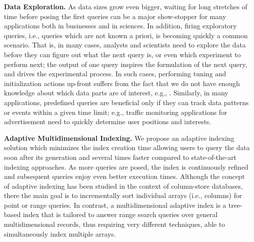 \textbf{Data Exploration.}
As data sizes grow even bigger, waiting for long stretches of time before posing the first queries can be a major show-stopper for many applications both in businesses and in sciences.
In addition, firing exploratory queries, i.e., queries which are not known a priori, is becoming quickly a common scenario. 
That is, in many cases, analysts and scientists need to explore the data before they can figure out what the next query is, or even which experiment to perform next; the output of one query inspires the formulation of the next query, and drives the experimental process. 
In such cases, performing tuning and initialization actions up-front suffers from the fact that we do not have enough knowledge about which data parts are of interest, e.g., \cite{Here_are, dbtouch_1, dbtouch_2}. 
Similarly, in many applications, predefined queries are beneficial only if they can track data patterns or events within a given time limit;
 e.g., traffic monitoring applications for advertisement need to quickly determine user positions and interests.

\textbf{Adaptive Multidimensional Indexing.}
We propose an adaptive indexing solution which minimizes the index creation time allowing users to query the data soon after its generation and several times faster compared to state-of-the-art indexing approaches.  
As more queries are posed, the index is continuously refined and subsequent queries enjoy even better execution times. 
Although the concept of adaptive indexing has been studied in the context of column-store databases, there the main goal is to incrementally sort  individual arrays (i.e., columns) for point or range queries.  
In contrast, a multidimensional adaptive index is a tree-based index that is tailored to answer range search queries over general multidimensional records, thus requiring very different techniques, able to simultaneously index multiple arrays.


